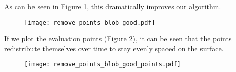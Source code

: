 As can be seen in Figure \ref{fig:remove-points-blob-good}, this dramatically improves our algorithm.

\begin{figure}[H]
    \begin{center}
      \texttt{[image: remove\_points\_blob\_good.pdf]}
    \end{center}
  \vspace{-.2in} %
  \caption{\label{fig:remove-points-blob-good}}
\end{figure}

If we plot the evaluation points (Figure \ref{fig:remove-points-blob-good-points}), it can be seen that the points redistribute themselves over time to stay evenly spaced on the surface.

\begin{figure}[H]
    \begin{center}
      \texttt{[image: remove\_points\_blob\_good\_points.pdf]}
    \end{center}
  \vspace{-.2in} %
  \caption{\label{fig:remove-points-blob-good-points}}
\end{figure}